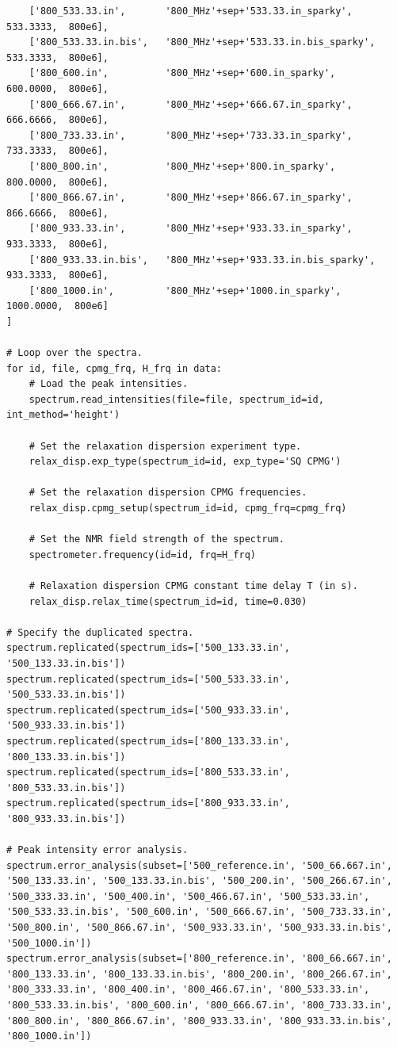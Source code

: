 \begin{lstlisting}
    ['800_533.33.in',       '800_MHz'+sep+'533.33.in_sparky',          533.3333,  800e6],
    ['800_533.33.in.bis',   '800_MHz'+sep+'533.33.in.bis_sparky',      533.3333,  800e6],
    ['800_600.in',          '800_MHz'+sep+'600.in_sparky',             600.0000,  800e6],
    ['800_666.67.in',       '800_MHz'+sep+'666.67.in_sparky',          666.6666,  800e6],
    ['800_733.33.in',       '800_MHz'+sep+'733.33.in_sparky',          733.3333,  800e6],
    ['800_800.in',          '800_MHz'+sep+'800.in_sparky',             800.0000,  800e6],
    ['800_866.67.in',       '800_MHz'+sep+'866.67.in_sparky',          866.6666,  800e6],
    ['800_933.33.in',       '800_MHz'+sep+'933.33.in_sparky',          933.3333,  800e6],
    ['800_933.33.in.bis',   '800_MHz'+sep+'933.33.in.bis_sparky',      933.3333,  800e6],
    ['800_1000.in',         '800_MHz'+sep+'1000.in_sparky',           1000.0000,  800e6]
]

# Loop over the spectra.
for id, file, cpmg_frq, H_frq in data:
    # Load the peak intensities.
    spectrum.read_intensities(file=file, spectrum_id=id, int_method='height')

    # Set the relaxation dispersion experiment type.
    relax_disp.exp_type(spectrum_id=id, exp_type='SQ CPMG')

    # Set the relaxation dispersion CPMG frequencies.
    relax_disp.cpmg_setup(spectrum_id=id, cpmg_frq=cpmg_frq)

    # Set the NMR field strength of the spectrum.
    spectrometer.frequency(id=id, frq=H_frq)

    # Relaxation dispersion CPMG constant time delay T (in s).
    relax_disp.relax_time(spectrum_id=id, time=0.030)

# Specify the duplicated spectra.
spectrum.replicated(spectrum_ids=['500_133.33.in', '500_133.33.in.bis'])
spectrum.replicated(spectrum_ids=['500_533.33.in', '500_533.33.in.bis'])
spectrum.replicated(spectrum_ids=['500_933.33.in', '500_933.33.in.bis'])
spectrum.replicated(spectrum_ids=['800_133.33.in', '800_133.33.in.bis'])
spectrum.replicated(spectrum_ids=['800_533.33.in', '800_533.33.in.bis'])
spectrum.replicated(spectrum_ids=['800_933.33.in', '800_933.33.in.bis'])

# Peak intensity error analysis.
spectrum.error_analysis(subset=['500_reference.in', '500_66.667.in', '500_133.33.in', '500_133.33.in.bis', '500_200.in', '500_266.67.in', '500_333.33.in', '500_400.in', '500_466.67.in', '500_533.33.in', '500_533.33.in.bis', '500_600.in', '500_666.67.in', '500_733.33.in', '500_800.in', '500_866.67.in', '500_933.33.in', '500_933.33.in.bis', '500_1000.in'])
spectrum.error_analysis(subset=['800_reference.in', '800_66.667.in', '800_133.33.in', '800_133.33.in.bis', '800_200.in', '800_266.67.in', '800_333.33.in', '800_400.in', '800_466.67.in', '800_533.33.in', '800_533.33.in.bis', '800_600.in', '800_666.67.in', '800_733.33.in', '800_800.in', '800_866.67.in', '800_933.33.in', '800_933.33.in.bis', '800_1000.in'])


\end{lstlisting}
